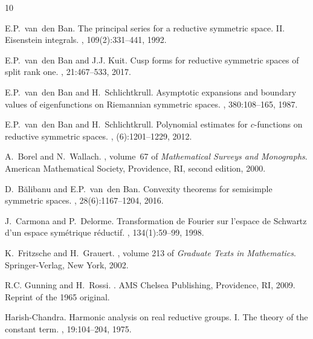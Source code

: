 \documentclass[12pt,a4paper]{article}
\numberwithin{Thm}{section}
\numberwithin{equation}{section}
\numberwithin{equation}{section}
\begin{document}
%
%
\begin{thebibliography}{10}

E.P.~van~den Ban.
\newblock The principal series for a reductive symmetric space. {II}.
  {E}isenstein integrals.
, 109(2):331--441, 1992.

E.P.~van~den Ban and J.J. Kuit.
\newblock Cusp forms for reductive symmetric spaces of split rank one.
, 21:467--533, 2017.

E.P.~van~den Ban and H.~Schlichtkrull.
\newblock Asymptotic expansions and boundary values of eigenfunctions on
  {R}iemannian symmetric spaces.
, 380:108--165, 1987.

E.P.~van~den Ban and H.~Schlichtkrull.
\newblock Polynomial estimates for {$c$}-functions on reductive symmetric
  spaces.
, (6):1201--1229, 2012.

A.~Borel and N.~Wallach.
, volume~67 of {\em Mathematical Surveys and Monographs}.
\newblock American Mathematical Society, Providence, RI, second edition, 2000.

D.~B\u{a}libanu and E.P.~van~den Ban.
\newblock Convexity theorems for semisimple symmetric spaces.
, 28(6):1167--1204, 2016.

J.~Carmona and P.~Delorme.
\newblock Transformation de {F}ourier sur l'espace de {S}chwartz d'un espace
  sym\'{e}trique r\'{e}ductif.
, 134(1):59--99, 1998.

K.~Fritzsche and H.~Grauert.
, volume 213 of
  {\em Graduate Texts in Mathematics}.
\newblock Springer-Verlag, New York, 2002.

R.C. Gunning and H.~Rossi.
.
\newblock AMS Chelsea Publishing, Providence, RI, 2009.
\newblock Reprint of the 1965 original.

Harish-Chandra.
\newblock Harmonic analysis on real reductive groups. {I}. {T}he theory of the
  constant term.
, 19:104--204, 1975.


\end{thebibliography}
\end{document}
